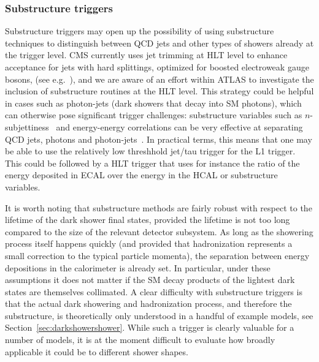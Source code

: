\subsubsection{Substructure triggers}  
Substructure triggers may open up the possibility of using substructure techniques to distinguish between QCD jets and other types of showers already at the trigger level.
CMS currently uses jet trimming at HLT level to enhance acceptance for jets with hard splittings, optimized for boosted electroweak gauge bosons, (see e.g.~\cite{Sirunyan:2017wto,Sirunyan:2017acf}), and we are aware of an effort within ATLAS to investigate the inclusion of substructure routines at the HLT level.   This strategy could be helpful in cases such as photon-jets (dark showers that decay into SM photons), which can otherwise pose significant trigger challenges: substructure variables such as $n$-subjettiness~\cite{Thaler:2010tr} and energy-energy correlations can be very effective at separating QCD jets, photons and photon-jets~\cite{Ellis:2012sd,Ellis:2012zp}. In practical terms, this means that one may be able to use the relatively low threshhold jet/tau trigger for the L1 trigger.  This could be followed by a HLT trigger that uses for instance the ratio of the energy deposited in ECAL over the energy in the HCAL or substructure variables.

It is worth noting that  substructure methods are fairly robust with respect to the lifetime of the dark shower final states, provided the lifetime is not too long compared to the size of the relevant detector subsystem. As long as the showering process itself happens quickly (and provided that hadronization represents a small correction to the typical particle momenta), %
the separation between energy depositions in the calorimeter is already set.  In particular, under these assumptions it does not matter if the SM decay products of the lightest dark states are themselves collimated. %
A clear difficulty with substructure triggers is that the actual dark showering and hadronization process, and therefore the substructure, is theoretically only understood in a handful of example models, see Section~\ref{sec:darkshowershower}. While such a trigger is clearly valuable for a number of models, it is at the moment difficult to evaluate how broadly applicable it could be to different shower shapes.

